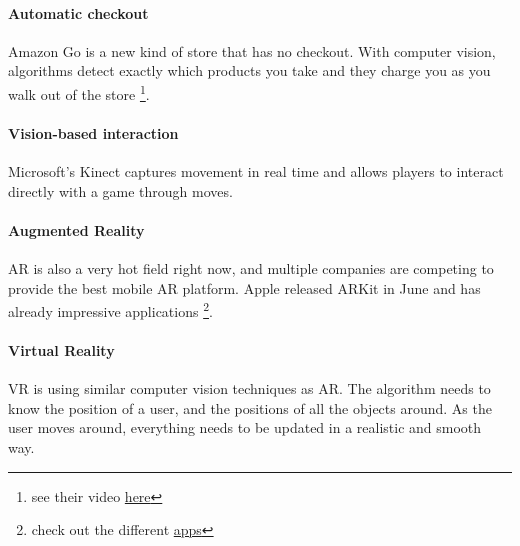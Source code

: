 \documentclass{article}
\begin{document}
\paragraph{Automatic checkout}
Amazon Go is a new kind of store that has no checkout. With computer vision, algorithms detect exactly which products you take and they charge you as you walk out of the store \footnote{see their video \href{https://www.amazon.com/b?node=16008589011}{here}}.

\paragraph{Vision-based interaction}
Microsoft's Kinect captures movement in real time and allows players to interact directly with a game through moves.

\paragraph{Augmented Reality}
AR is also a very hot field right now, and multiple companies are competing to provide the best mobile AR platform. Apple released ARKit in June and has already impressive applications \footnote{check out the different \href{http://www.madewitharkit.com}{apps}}.

\paragraph{Virtual Reality}
VR is using similar computer vision techniques as AR. The algorithm needs to know the position of a user, and the positions of all the objects around. As the user moves around, everything needs to be updated in a realistic and smooth way.





\small


\end{document}
